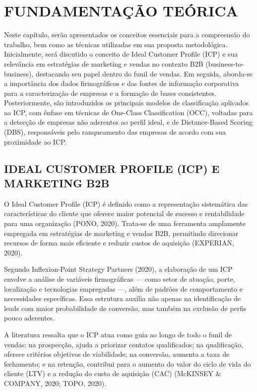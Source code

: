 \chapter{FUNDAMENTAÇÃO TEÓRICA}

Neste capítulo, serão apresentados os conceitos essenciais para a compreensão do trabalho, bem como as técnicas utilizadas em sua proposta metodológica. Inicialmente, será discutido o conceito de Ideal Customer Profile (ICP) e sua relevância em estratégias de marketing e vendas no contexto B2B (business-to-business), destacando seu papel dentro do funil de vendas. Em seguida, aborda-se a importância dos dados firmográficos e das fontes de informação corporativa para a caracterização de empresas e a formação de bases consistentes. Posteriormente, são introduzidos os principais modelos de classificação aplicados ao ICP, com ênfase em técnicas de One-Class Classification (OCC), voltadas para a detecção de empresas não aderentes ao perfil ideal, e de Distance-Based Scoring (DBS), responsáveis pelo ranqueamento das empresas de acordo com sua proximidade ao ICP.

\section{IDEAL CUSTOMER PROFILE (ICP) E MARKETING B2B}

O Ideal Customer Profile (ICP) é definido como a representação sistemática das características do cliente que oferece maior potencial de sucesso e rentabilidade para uma organização (PONO, 2020). Trata-se de uma ferramenta amplamente empregada em estratégias de marketing e vendas B2B, permitindo direcionar recursos de forma mais eficiente e reduzir custos de aquisição (EXPERIAN, 2020).

Segundo Inflexion-Point Strategy Partners (2020), a elaboração de um ICP envolve a análise de variáveis firmográficas — como setor de atuação, porte, localização e tecnologias empregadas —, além de padrões de comportamento e necessidades específicas. Essa estrutura auxilia não apenas na identificação de leads com maior probabilidade de conversão, mas também na exclusão de perfis pouco aderentes.

A literatura ressalta que o ICP atua como guia ao longo de todo o funil de vendas: na prospecção, ajuda a priorizar contatos qualificados; na qualificação, oferece critérios objetivos de viabilidade; na conversão, aumenta a taxa de fechamento; e na retenção, contribui para o aumento do valor do ciclo de vida do cliente (LTV) e a redução do custo de aquisição (CAC) (McKINSEY \& COMPANY, 2020; TOPO, 2020).

